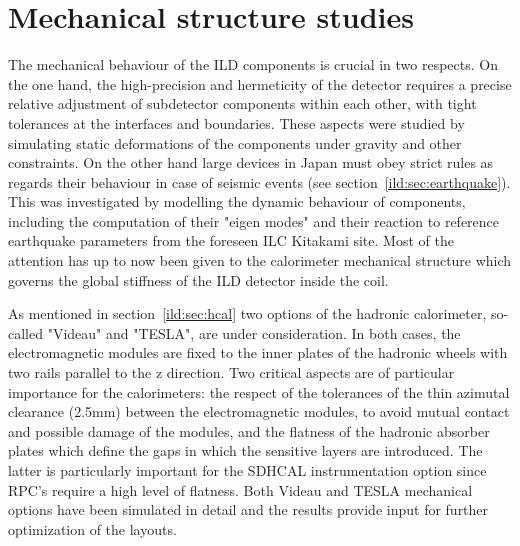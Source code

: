 \section{Mechanical structure studies}
\label{ild:sec:mechanical_structures}

The mechanical behaviour of the ILD components is crucial in two respects. On the one hand, the high-precision and hermeticity of the detector requires a precise relative adjustment of subdetector components within each other, with tight tolerances at the interfaces and boundaries. These aspects were studied by simulating static deformations of the components under gravity and other constraints. On the other hand large devices in Japan must obey strict rules as regards their behaviour in case of seismic events (see section~\ref{ild:sec:earthquake}). This was investigated by modelling the dynamic behaviour of components, including the computation of their "eigen modes" and their reaction to reference earthquake parameters from the foreseen ILC Kitakami site. Most of the attention has up to now been given to the calorimeter mechanical structure which governs the global stiffness of the ILD detector inside the coil. %


As mentioned in section~\ref{ild:sec:hcal} two options of the hadronic calorimeter, so-called "Videau" and "TESLA", are under consideration. In both cases, the electromagnetic modules are fixed to the inner plates of the hadronic wheels with two rails parallel to the z direction. Two critical aspects are of particular importance for the calorimeters: the respect of the tolerances of the thin azimutal clearance (2.5mm) between the electromagnetic modules, to avoid mutual contact and possible damage of the modules, and the flatness of the hadronic absorber plates which define the gaps in which the sensitive layers are introduced. The latter is particularly important for the SDHCAL instrumentation option since RPC's require a high level of flatness. Both Videau and TESLA mechanical options have been simulated in detail and the results provide input for further optimization of the layouts.

